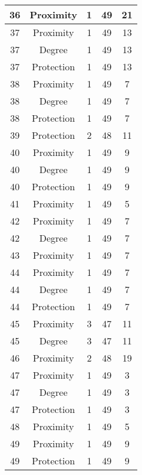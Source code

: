\documentclass[results.tex]{subfiles}
\begin{document}
\begin{center}
\begin{tabular}{| c || c | c | c | c |}
    \hline
    36 & Proximity & 1 & 49 & 21 \\ 
    \hline
    37 & Proximity & 1 & 49 & 13 \\ 
    \hline
    37 & Degree & 1 & 49 & 13 \\ 
    \hline
    37 & Protection & 1 & 49 & 13 \\ 
    \hline
    38 & Proximity & 1 & 49 & 7 \\ 
    \hline
    38 & Degree & 1 & 49 & 7 \\ 
    \hline
    38 & Protection & 1 & 49 & 7 \\ 
    \hline
    39 & Protection & 2 & 48 & 11 \\ 
    \hline
    40 & Proximity & 1 & 49 & 9 \\ 
    \hline
    40 & Degree & 1 & 49 & 9 \\ 
    \hline
    40 & Protection & 1 & 49 & 9 \\ 
    \hline
    41 & Proximity & 1 & 49 & 5 \\ 
    \hline
    42 & Proximity & 1 & 49 & 7 \\ 
    \hline
    42 & Degree & 1 & 49 & 7 \\ 
    \hline
    43 & Proximity & 1 & 49 & 7 \\ 
    \hline
    44 & Proximity & 1 & 49 & 7 \\ 
    \hline
    44 & Degree & 1 & 49 & 7 \\ 
    \hline
    44 & Protection & 1 & 49 & 7 \\ 
    \hline
    45 & Proximity & 3 & 47 & 11 \\ 
    \hline
    45 & Degree & 3 & 47 & 11 \\ 
    \hline
    46 & Proximity & 2 & 48 & 19 \\ 
    \hline
    47 & Proximity & 1 & 49 & 3 \\ 
    \hline
    47 & Degree & 1 & 49 & 3 \\ 
    \hline
    47 & Protection & 1 & 49 & 3 \\ 
    \hline
    48 & Proximity & 1 & 49 & 5 \\ 
    \hline
    49 & Proximity & 1 & 49 & 9 \\ 
    \hline
    49 & Protection & 1 & 49 & 9 \\ 
    \hline   \end{tabular}
\end{center}
\end{document}
